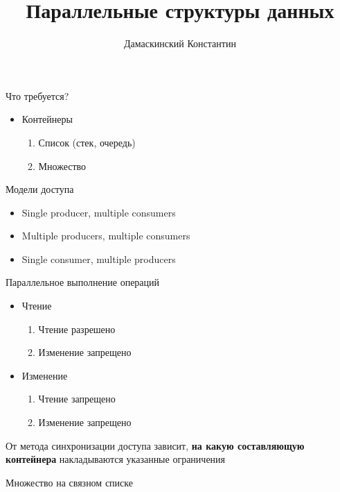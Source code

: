 \documentclass[14pt]{beamer}
\begin{document}
	\begin{frame}
		\title{Параллельные структуры данных}
		\author{Дамаскинский Константин}
		\titlepage
	\end{frame}

	\begin{frame}{Что требуется?}
		\begin{itemize}
			\item Контейнеры
			\begin{enumerate}
				\item Список (стек, очередь)
				\item Множество
			\end{enumerate}
		\end{itemize}
	\end{frame}

	\begin{frame}{Модели доступа}
		\begin{itemize}
			\item Single producer, multiple consumers
			\item Multiple producers, multiple consumers
			\item Single consumer, multiple producers
		\end{itemize}
	\end{frame}

	\begin{frame}{Параллельное выполнение операций}
		\begin{itemize}
			\item Чтение
			\begin{enumerate}
				\item Чтение разрешено
				\item Изменение запрещено
			\end{enumerate}
			\item Изменение
			\begin{enumerate}
				\item Чтение запрещено
				\item Изменение запрещено
			\end{enumerate}
		\end{itemize}
	
		От метода синхронизации доступа зависит, \textbf{на какую составляющую контейнера} накладываются указанные ограничения
	\end{frame}

	\begin{frame}
		\begin{center}
			\Large{Множество на связном списке}
		\end{center}
	\end{frame}
	
\end{document}
